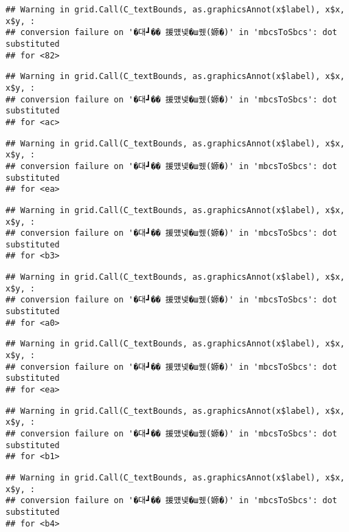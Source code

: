\documentclass[
]{article}
\begin{document}
\begin{verbatim}
## Warning in grid.Call(C_textBounds, as.graphicsAnnot(x$label), x$x, x$y, :
## conversion failure on '�대┛�� 援먰넻�ш퀬(嫄�)' in 'mbcsToSbcs': dot substituted
## for <82>
\end{verbatim}

\begin{verbatim}
## Warning in grid.Call(C_textBounds, as.graphicsAnnot(x$label), x$x, x$y, :
## conversion failure on '�대┛�� 援먰넻�ш퀬(嫄�)' in 'mbcsToSbcs': dot substituted
## for <ac>
\end{verbatim}

\begin{verbatim}
## Warning in grid.Call(C_textBounds, as.graphicsAnnot(x$label), x$x, x$y, :
## conversion failure on '�대┛�� 援먰넻�ш퀬(嫄�)' in 'mbcsToSbcs': dot substituted
## for <ea>
\end{verbatim}

\begin{verbatim}
## Warning in grid.Call(C_textBounds, as.graphicsAnnot(x$label), x$x, x$y, :
## conversion failure on '�대┛�� 援먰넻�ш퀬(嫄�)' in 'mbcsToSbcs': dot substituted
## for <b3>
\end{verbatim}

\begin{verbatim}
## Warning in grid.Call(C_textBounds, as.graphicsAnnot(x$label), x$x, x$y, :
## conversion failure on '�대┛�� 援먰넻�ш퀬(嫄�)' in 'mbcsToSbcs': dot substituted
## for <a0>
\end{verbatim}

\begin{verbatim}
## Warning in grid.Call(C_textBounds, as.graphicsAnnot(x$label), x$x, x$y, :
## conversion failure on '�대┛�� 援먰넻�ш퀬(嫄�)' in 'mbcsToSbcs': dot substituted
## for <ea>
\end{verbatim}

\begin{verbatim}
## Warning in grid.Call(C_textBounds, as.graphicsAnnot(x$label), x$x, x$y, :
## conversion failure on '�대┛�� 援먰넻�ш퀬(嫄�)' in 'mbcsToSbcs': dot substituted
## for <b1>
\end{verbatim}

\begin{verbatim}
## Warning in grid.Call(C_textBounds, as.graphicsAnnot(x$label), x$x, x$y, :
## conversion failure on '�대┛�� 援먰넻�ш퀬(嫄�)' in 'mbcsToSbcs': dot substituted
## for <b4>
\end{verbatim}
\end{document}
